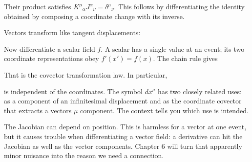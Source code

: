 \documentclass[
  11pt,
  letterpaper,
  oneside,
  openany]{scrbook}
\begin{document}
Their product satisfies
\(K^\mu{}_{\alpha}J^\alpha{}_{\nu}=\delta^\mu{}_{\nu}\). This follows by
differentiating the identity obtained by composing a coordinate change
with its inverse.

Vectors transform like tangent displacements:

\begin{center}
\begingroup
{}
\ifdim\wd\grmathbox>\linewidth
\resizebox{\linewidth}{!}{\usebox{\grmathbox}}
\else\usebox{\grmathbox}\fi
\endgroup
\end{center}

Now differentiate a scalar field \(f\). A scalar has a single value at
an event; its two coordinate representations obey \(f'(x')=f(x)\). The
chain rule gives

\begin{center}
\begingroup
{}
\ifdim\wd\grmathbox>\linewidth
\resizebox{\linewidth}{!}{\usebox{\grmathbox}}
\else\usebox{\grmathbox}\fi
\endgroup
\end{center}

That is the covector transformation law. In particular,

\begin{center}
\begingroup
{}
\ifdim\wd\grmathbox>\linewidth
\resizebox{\linewidth}{!}{\usebox{\grmathbox}}
\else\usebox{\grmathbox}\fi
\endgroup
\end{center}

is independent of the coordinates. The symbol \(dx^\mu\) has two closely
related uses: as a component of an infinitesimal displacement and as the
coordinate covector that extracts a vector\textquotesingle s \(\mu\)
component. The context tells you which use is intended.

The Jacobian can depend on position. This is harmless for a vector at
one event, but it causes trouble when differentiating a vector field: a
derivative can hit the Jacobian as well as the vector components.
Chapter 6 will turn that apparently minor nuisance into the reason we
need a connection.
\end{document}
